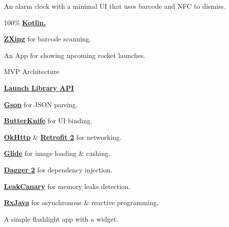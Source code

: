 \documentclass[]{Resume}
\begin{document}
\begin{minipage}[t]{0.66\textwidth}
An alarm clock with a minimal UI that uses barcode and NFC to dismiss.
\begin{tightemize}
\item 100\% \textbf{\href{http://kotlinlang.org}{Kotlin.}}
\item \textbf{\href{http://github.com/zxing/zxing}{ZXing}} for barcode scanning.
\end{tightemize}
\sectionsep

An App for showing upcoming rocket launches.
\begin{tightemize}
\item MVP Architecture
\item  \textbf{\href{http://launchlibrary.net/}{Launch Library API}}
\item \textbf{\href{http://github.com/google/gson}{Gson}} for JSON parsing.
\item \textbf{\href{http://jakewharton.github.io/butterknife/}{ButterKnife}} for UI binding.
\item \textbf{\href{http://square.github.io/okhttp}{OkHttp}} \& \textbf{\href{http://square.github.io/retrofit}{Retrofit 2}} for networking.
\item \textbf{\href{http://github.com/bumptech/glide}{Glide}} for image loading \& cashing.
\item \textbf{\href{http://github.com/google/dagger}{Dagger 2}} for dependency injection.
\item \textbf{\href{http://github.com/square/leakcanary}{LeakCanary}} for memory leaks detection.
\item \textbf{\href{http://github.com/ReactiveX/RxJava}{RxJava}} for asynchronous \& reactive programming.
\end{tightemize}
\sectionsep

A simple flashlight app with a widget.
\sectionsep



\end{minipage} 
\end{document}
